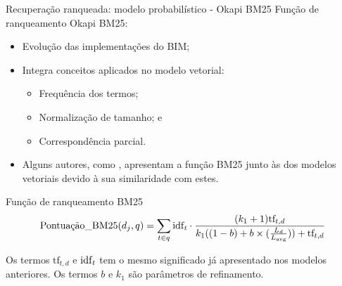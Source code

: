 \documentclass[%
  10pt,%
  aspectratio = 169,%
  compress,%
  t,%
]{beamer}%
\begin{document}
    \begin{frame}[fragile = singleslide]{}{Recuperação ranqueada: modelo probabilístico - Okapi BM25}
        Função de ranqueamento Okapi BM25:
        \begin{itemize}
            \item Evolução das implementações do BIM;
            \item Integra conceitos aplicados no modelo vetorial:
                \begin{itemize}
                    \item Frequência dos termos;
                    \item Normalização de tamanho; e
                    \item Correspondência parcial.
                \end{itemize}
            \item Alguns autores, como \cite[p.~111]{Zhai2016TDMA}, apresentam a função BM25 junto às dos modelos vetoriais devido à sua similaridade com estes.
        \end{itemize}

        \begin{block}{Função de ranqueamento BM25}
            \begin{equation}
                \label{eq:okapi-bm25}
        		\text{Pontuação\_BM25}(d_j, q) = \sum_{t \in q} \text{idf}_{\text{\textit{t}}}
        		\cdot
        		\frac{(k_1 + 1) \text{tf}_{t,d}}{k_1((1-b)+b \times (\frac{L_d}{L_{\text{avg}}})) + \text{tf}_{t,d}}
            \end{equation}
        \end{block}
        Os termos $\text{tf}_{t,d}$ e $\text{idf}_{\text{\textit{t}}}$ tem o mesmo significado já apresentado nos modelos anteriores.
        Os termos $b$ e $k_1$ são parâmetros de refinamento.
    \end{frame}
\end{document}
